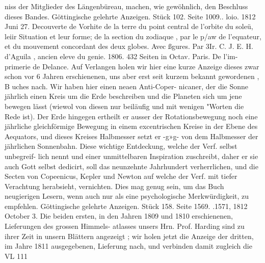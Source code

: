 \documentclass[12pt,a4paper]{article}
\begin{document}
niss der Mitglieder des Längenbüreau, machen, wie gewöhnlich, den Beschluss dieses Bandes.\newline
Göttingische gelehrte Anzeigen. Stück 102. Seite 1009.. loio. 1812 Juni 27.\newline
Decouverte de Vorhite de la terre du point central de l'orbite du soleü, leiir Situation et leur forme;\newline
de la section du zodiaque , par le p/aw de l'equateur, et du mouvement concordant des deux globes. Avec\newline
ßgures. Par 3Ir. C. J. E. H. d'Aguila , ancien eleve du genie. 1806. 432 Seiten in Octav. Paris. De l'im-\newline
primerie de Delance.\newline
Auf Verlangen holen wir hier eine kurze Anzeige dieses zwar schon vor 6 Jahren erschienenen,\newline
uns aber erst seit kurzem bekannt gewordenen , B uches nach. Wir haben hier einen neaen Anti-Coper-\newline
nicaner, der die Sonne jährlich einen Kreis um die Erde beschreiben und die Planeten sich um jene\newline
bewegen lässt (wiewol von diesen nur beiläufig und mit wenigen "Worten die Rede ist). Der Erde\newline
hingegen ertheilt er ausser der Rotationsbewegung noch eine jährliche gleichförmige Bewegung in einem\newline
excentrischen Kreise in der Ebene des Aequators, und dieses Kreises Halbmesser setzt er -g»g- von dem\newline
Halbmesser der jährlichen Sonnenbahn. Diese wichtige Entdeckung, welche der Verf. selbst unbegreif-\newline
lich nennt und einer unmittelbaren Inspiration zuschreibt, daher er sie auch Gott selbst dedicirt, soll\newline
das neunzehnte Jahrhundert verherrlichen, und die Secten von Copeenicus, Kepler und Newton auf\newline
welche der Verf. mit tiefer Verachtung herabsieht, vernichten. Dies mag genug sein, um das Buch\newline
neugierigen Lesern, wenn auch nur als eine psychologische Merkwürdigkeit, zu empfehlen.\newline
Göttingische gelehrte Anzeigen. Stück 158. Seite 1569. .1571, 1812 October 3.\newline
Die beiden ersten, in den Jahren 1809 und 1810 erschienenen, Lieferungen des grossen Himmels-\newline
atlasses unsers Hrn. Prof. Harding sind zu ihrer Zeit in unsern Blättern angezeigt ; wir holen jetzt die\newline
Anzeige der dritten, im Jahre 1811 ausgegebenen, Lieferung nach, und verbinden damit zugleich die\newline
VL 111\newline
\end{document}
